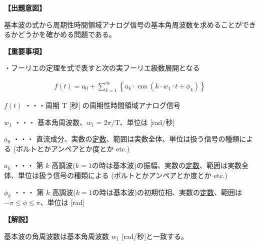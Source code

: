 \noindent \textbf{【出題意図】}

\noindent 基本波の式から周期性時間領域アナログ信号の基本角周波数を求めることができるかどうかを確かめる問題である。

\vspace{1em}
\noindent \textbf{【重要事項】}

\medskip
\noindent ・フーリエの定理を式で表すと次の実フーリエ級数展開となる

\begin{align*}
f(t) = a_0 + \sum_{k=1}^{\infty}
\left \{
a_k \cdot \cos (k \cdot w_1 \cdot t + \phi_k)
\right \}
\end{align*}

\medskip
\noindent $f(t)$ ・・・周期 $\textrm{T}$ [秒] の周期性時間領域アナログ信号

\medskip
\noindent $w_1$ ・・・ 基本角周波数、$w_1 = 2\pi/\textrm{T}$、単位は [rad/秒]

\medskip
\noindent $a_0$ ・・・ 直流成分、実数の\underline{定数}、範囲は実数全体、単位は扱う信号の種類による (ボルトとかアンペアとか度とか etc.)

\medskip
\noindent $a_k$ ・・・ 第 $k$ 高調波($k=1$の時は基本波)の振幅、実数の\underline{定数}、範囲は実数全体、単位は扱う信号の種類による (ボルトとかアンペアとか度とか etc.)

\medskip
\noindent $\phi_k$ ・・・ 第 $k$ 高調波($k=1$の時は基本波)の初期位相、実数の\underline{定数}、範囲は $-\pi \leq \phi \leq \pi$、単位は [rad]


\vspace{1em}
\noindent \textbf{【解説】}

\noindent 基本波の角周波数は基本角周波数 $w_1$ [rad/秒]と一致する。
